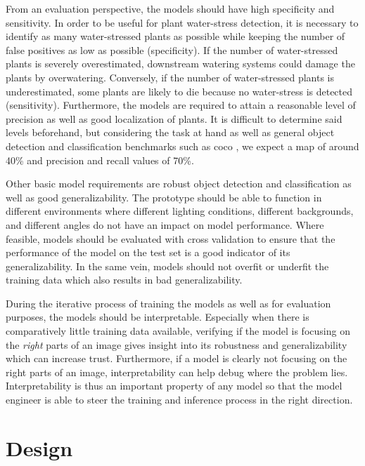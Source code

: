 \documentclass[draft,final]{vutinfth} %
\begin{document}
From an evaluation perspective, the models should have high
specificity and sensitivity. In order to be useful for plant
water-stress detection, it is necessary to identify as many
water-stressed plants as possible while keeping the number of false
positives as low as possible (specificity). If the number of
water-stressed plants is severely overestimated, downstream watering
systems could damage the plants by overwatering. Conversely, if the
number of water-stressed plants is underestimated, some plants are
likely to die because no water-stress is detected (sensitivity).
Furthermore, the models are required to attain a reasonable level of
precision as well as good localization of plants. It is difficult to
determine said levels beforehand, but considering the task at hand as
well as general object detection and classification benchmarks such as
\gls{coco} \cite{lin2015}, we expect a \gls{map} of around 40\% and
precision and recall values of 70\%.

Other basic model requirements are robust object detection and
classification as well as good generalizability. The prototype should
be able to function in different environments where different lighting
conditions, different backgrounds, and different angles do not have an
impact on model performance. Where feasible, models should be
evaluated with cross validation to ensure that the performance of the
model on the test set is a good indicator of its generalizability. In
the same vein, models should not overfit or underfit the training data
which also results in bad generalizability.

During the iterative process of training the models as well as for
evaluation purposes, the models should be interpretable. Especially
when there is comparatively little training data available, verifying
if the model is focusing on the \emph{right} parts of an image gives
insight into its robustness and generalizability which can increase
trust. Furthermore, if a model is clearly not focusing on the right
parts of an image, interpretability can help debug where the problem
lies. Interpretability is thus an important property of any model so
that the model engineer is able to steer the training and inference
process in the right direction.

\section{Design}
\label{sec:design}
\end{document}
